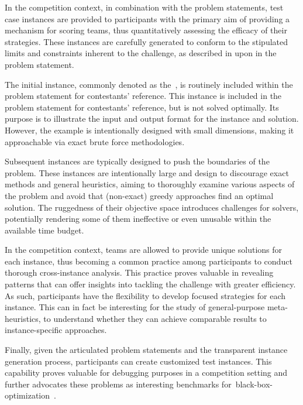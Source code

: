 In the competition context, in combination with the problem statements, test
case instances are provided to participants with the primary aim of providing a
mechanism for scoring teams, thus quantitatively assessing the efficacy of their
strategies. These instances are carefully generated to conform to the stipulated
limits and constraints inherent to the challenge, as described in upon in the
problem statement.

The initial instance, commonly denoted as the~, is routinely
included within the problem statement for contestants' reference. This instance
is included in the problem statement for contestants' reference, but is not
solved optimally. Its purpose is to illustrate the input and output format for
the instance and solution. However, the example is intentionally designed with
small dimensions, making it approachable via exact brute force methodologies.

Subsequent instances are typically designed to push the boundaries of the problem.
These instances are intentionally large and design to discourage exact methods
and general heuristics, aiming to thoroughly examine various aspects of the
problem and avoid that (non-exact) greedy approaches find an optimal solution.
The ruggedness of their objective space introduces challenges for solvers,
potentially rendering some of them ineffective or even unusable within the
available time budget.

In the competition context, teams are allowed to provide unique solutions for
each instance, thus becoming a common practice among participants to conduct
thorough cross-instance analysis. This practice proves valuable in revealing
patterns that can offer insights into tackling the challenge with greater
efficiency. As such, participants have the flexibility to develop focused
strategies for each instance. This can in fact be interesting for the study of
general-purpose meta-heuristics, to understand whether they can achieve
comparable results to instance-specific approaches.

Finally, given the articulated problem statements and the transparent instance
generation process, participants can create customized test instances. This
capability proves valuable for debugging purposes in a competition setting and
further advocates these problems as interesting benchmarks
for~\acrshort{black-box-optimization}~\cite{bartz-beielstein2020benchmarking}.